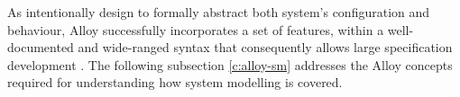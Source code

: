 As intentionally design to formally abstract both system's configuration and behaviour, Alloy successfully incorporates a set of features, within a well-documented and wide-ranged syntax that consequently allows large specification development \cite{lwspecification}. The following subsection \ref{c:alloy-sm} addresses the Alloy concepts required for understanding how system modelling is covered. 

% 
% 
% 

% 
% 


